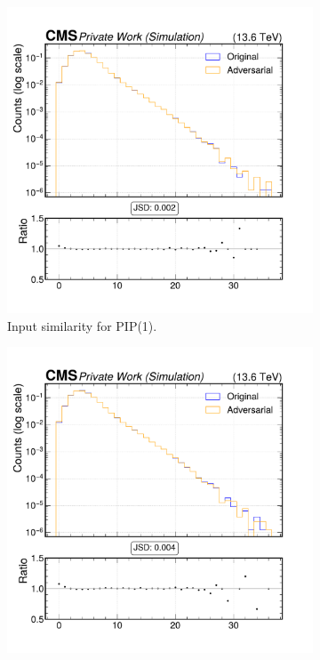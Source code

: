 \begin{figure}[h]
  \centering
  \begin{subfigure}[t]{0.32\textwidth}
    \includegraphics[width=\linewidth]{media/output/features/compare/intprob_1/cmp_global_features_TagVarCSV_jetNSelectedTracks.pdf}
    \caption{Input similarity for PIP(1).}
  \end{subfigure}\hfill
  \begin{subfigure}[t]{0.32\textwidth}
    \includegraphics[width=\linewidth]{media/output/features/compare/intprob_2/cmp_global_features_TagVarCSV_jetNSelectedTracks.pdf}

\end{subfigure}
\end{figure}
